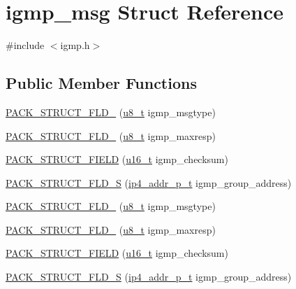 \hypertarget{structigmp__msg}{}\section{igmp\+\_\+msg Struct Reference}
\label{structigmp__msg}


{\ttfamily \#include $<$igmp.\+h$>$}

\subsection*{Public Member Functions}
\begin{DoxyCompactItemize}
\item 
\hyperlink{structigmp__msg_a623a3baf99a86878b7d0c2a87a7f9935}{P\+A\+C\+K\+\_\+\+S\+T\+R\+U\+C\+T\+\_\+\+F\+L\+D\+\_} (\hyperlink{group__compiler__abstraction_ga4caecabca98b43919dd11be1c0d4cd8e}{u8\+\_\+t} igmp\+\_\+msgtype)
\item 
\hyperlink{structigmp__msg_a12565eb2acf6950ee18c368054fe0836}{P\+A\+C\+K\+\_\+\+S\+T\+R\+U\+C\+T\+\_\+\+F\+L\+D\+\_} (\hyperlink{group__compiler__abstraction_ga4caecabca98b43919dd11be1c0d4cd8e}{u8\+\_\+t} igmp\+\_\+maxresp)
\item 
\hyperlink{structigmp__msg_a875894e6ca7849ad9eae5f81f5eeab29}{P\+A\+C\+K\+\_\+\+S\+T\+R\+U\+C\+T\+\_\+\+F\+I\+E\+LD} (\hyperlink{group__compiler__abstraction_ga77570ac4fcab86864fa1916e55676da2}{u16\+\_\+t} igmp\+\_\+checksum)
\item 
\hyperlink{structigmp__msg_a935034863490ec706ba33f238b77126a}{P\+A\+C\+K\+\_\+\+S\+T\+R\+U\+C\+T\+\_\+\+F\+L\+D\+\_\+S} (\hyperlink{native_2lwip_2src_2include_2lwip_2prot_2ip4_8h_ae5011654fcbadf6b6582b8d49446107f}{ip4\+\_\+addr\+\_\+p\+\_\+t} igmp\+\_\+group\+\_\+address)
\item 
\hyperlink{structigmp__msg_a623a3baf99a86878b7d0c2a87a7f9935}{P\+A\+C\+K\+\_\+\+S\+T\+R\+U\+C\+T\+\_\+\+F\+L\+D\+\_} (\hyperlink{group__compiler__abstraction_ga4caecabca98b43919dd11be1c0d4cd8e}{u8\+\_\+t} igmp\+\_\+msgtype)
\item 
\hyperlink{structigmp__msg_a12565eb2acf6950ee18c368054fe0836}{P\+A\+C\+K\+\_\+\+S\+T\+R\+U\+C\+T\+\_\+\+F\+L\+D\+\_} (\hyperlink{group__compiler__abstraction_ga4caecabca98b43919dd11be1c0d4cd8e}{u8\+\_\+t} igmp\+\_\+maxresp)
\item 
\hyperlink{structigmp__msg_a875894e6ca7849ad9eae5f81f5eeab29}{P\+A\+C\+K\+\_\+\+S\+T\+R\+U\+C\+T\+\_\+\+F\+I\+E\+LD} (\hyperlink{group__compiler__abstraction_ga77570ac4fcab86864fa1916e55676da2}{u16\+\_\+t} igmp\+\_\+checksum)
\item 
\hyperlink{structigmp__msg_a935034863490ec706ba33f238b77126a}{P\+A\+C\+K\+\_\+\+S\+T\+R\+U\+C\+T\+\_\+\+F\+L\+D\+\_\+S} (\hyperlink{native_2lwip_2src_2include_2lwip_2prot_2ip4_8h_ae5011654fcbadf6b6582b8d49446107f}{ip4\+\_\+addr\+\_\+p\+\_\+t} igmp\+\_\+group\+\_\+address)
\end{DoxyCompactItemize}


